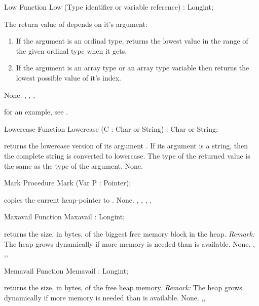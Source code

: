 \documentclass{report}
\begin{document}
\begin{function}{Low}
\Declaration
Function Low (Type identifier or variable reference) : Longint;

\Description
 The return value of  depends on it's argument:
\begin{enumerate}
\item If the argument is an ordinal type,  returns the lowest value in the range of the given ordinal 
type when it gets.
\item If the argument is an array type or an array type variable then 
 returns the lowest possible value of it's index.
\end{enumerate}

\Errors
None.
\SeeAlso
{}, , , 
\end{function}
for an example, see .
\begin{function}{Lowercase}
\Declaration
Function Lowercase (C : Char or String) : Char or String;

\Description
{} returns the lowercase version of its argument .
If its argument is a string, then the complete string is converted to
lowercase. The type of the returned value is the same as the type of the
argument.
\Errors
None.
\SeeAlso
{}
\end{function}
\html{}
\begin{procedure}{Mark}
\Declaration
Procedure Mark (Var P : Pointer);

\Description
{} copies the current heap-pointer to .
\Errors
None.
\SeeAlso
{}, , , , 
\end{procedure}
\html{}
\begin{function}{Maxavail}
\Declaration
Function Maxavail  : Longint;

\Description
{} returns the size, in bytes, of the biggest free memory block in
the heap.
{\em Remark:} The heap grows dynamically if more memory is needed than is
available.
\Errors
None.
\SeeAlso
{}, ,, 
\end{function}
\html{}
\begin{function}{Memavail}
\Declaration
Function Memavail  : Longint;

\Description
{} returns the size, in bytes, of the free heap memory.
{\em Remark:} The heap grows dynamically if more memory is needed than is
available.
\Errors
None.
\SeeAlso
{},, 
\end{function}
\end{document}
